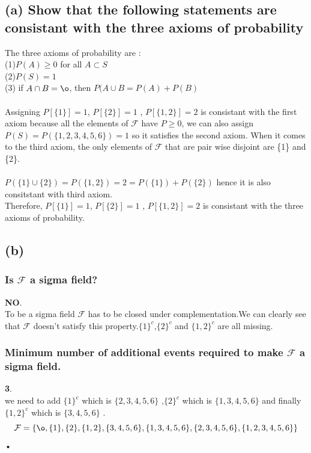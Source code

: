 \documentclass[a4paper,11pt]{article}
\begin{document}
\subsection*{(a) Show that the following statements are consistant with the three axioms of probability}
The three axioms of probability are :\\
(1)$P(A) \ge 0$ for all $A \subset S$ \\
(2)$P(S) = 1$\\
(3) if $A \cap B = \o$, then $P(A \cup B = P(A)+P(B)$  \\\\
Assigning $P[\{1\}]=1$, $P[\{2\}]=1$ , $P[\{1,2\}]=2$ is consistant with the first axiom because all the elements of $\mathcal{F}$ have $P \ge 0$, we can also assign $P(S) = P(\{1,2,3,4,5,6\}) = 1$ so it satisfies the second axiom.
When it comes to the third axiom, the only elements of $\mathcal{F}$ that are pair wise disjoint are \{1\} and \{2\}.\\\\
 $P(\{1\}\cup \{2\})=P(\{1,2\}) = 2 = P(\{1\}) + P(\{2\})$ hence it is also consitstant with third axiom.\\
 Therefore, $P[\{1\}]=1$, $P[\{2\}]=1$ , $P[\{1,2\}]=2$ is consistant with the three axioms of probability.

\subsection*{(b)}

\subsubsection*{Is $\mathcal{F}$ a sigma field?}
\textbf{NO}.\\
To be a sigma field $\mathcal{F}$ has to be closed under complementation.We can clearly see that $\mathcal{F}$ doesn't satisfy this property.$\{1\}^c$,$\{2\}^c$ and $\{1,2\}^c$ are all missing. \\
\subsubsection*{Minimum number of additional events required to make  $\mathcal{F}$ a sigma field.}
\textbf{3}.\\
we need to add $\{1\}^c$ which is $\{2,3,4,5,6\}$ ,$\{2\}^c$ which is $\{1,3,4,5,6\}$ and finally $\{1,2\}^c$ which is $\{3,4,5,6\}$ .\\
\begin{equation}\label{eq:new_f}
\mathcal{F} = \{ \o , \{1\},\{2\},\{1,2\},\{3,4,5,6\},\{1,3,4,5,6\},\{2,3,4,5,6\},\{1,2,3,4,5,6\}\}
\end{equation}•
\end{document}
